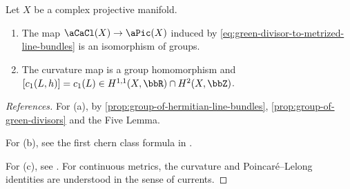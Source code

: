\begin{theorem}[label=\labelNFM{thm:metrics-green-functions-and-forms}, status=draft, tag=0000000]
	Let \(X\) be a complex projective manifold.
  \begin{enumerate}
    \item The map $\aCaCl(X) \to \aPic(X)$ induced by \cref{eq:green-divisor-to-metrized-line-bundles} is an isomorphism of groups.

    \item The curvature map is a group homomorphism and $[c_1(L,h)] = c_1(L) \in H^{1,1}(X,\bbR) \cap H^2(X,\bbZ)$.


  \end{enumerate}
\end{theorem}
\begin{proof}[References]
	For (a), by \cref{prop:group-of-hermitian-line-bundles}, \cref{prop:group-of-green-divisors} and the Five Lemma.

	For (b), see the first chern class formula in \cite[Chapter~V, \S 9, Theorem~9.5]{Demailly-2012-ComplexAnalyticDifferential}.

	For (c), see \cite[Chapter~V, \S 13, (13.2)--(13.3), and Chapter~III, \S 2, (2.15)]{Demailly-2012-ComplexAnalyticDifferential}.
	For continuous metrics, the curvature and Poincar\'e--Lelong identities are understood in the sense of currents.
\end{proof}
